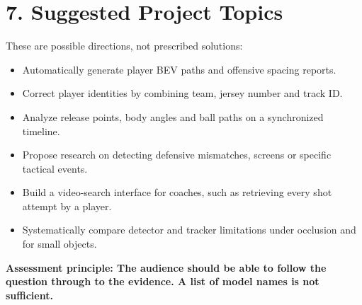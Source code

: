 \documentclass[11pt,a4paper]{article}
\begin{document}
\section{7. Suggested Project Topics}

These are possible directions, not prescribed solutions:

\begin{itemize}[leftmargin=1.6em,itemsep=3pt]
  \item Automatically generate player BEV paths and offensive spacing reports.
  \item Correct player identities by combining team, jersey number and track ID.
  \item Analyze release points, body angles and ball paths on a synchronized timeline.
  \item Propose research on detecting defensive mismatches, screens or specific tactical events.
  \item Build a video-search interface for coaches, such as retrieving every shot attempt by a player.
  \item Systematically compare detector and tracker limitations under occlusion and for small objects.
\end{itemize}

\vfill
\begin{center}
\small\textbf{Assessment principle: The audience should be able to follow the question through to the evidence. A list of model names is not sufficient.}
\end{center}
\end{document}
